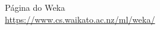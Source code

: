 \documentclass[a4paper,11pt]{article}
\begin{document}


\begin{thebibliography}{4}
	Página do Weka \\
	\url{https://www.cs.waikato.ac.nz/ml/weka/}
	
	
\end{thebibliography}
\end{document}
